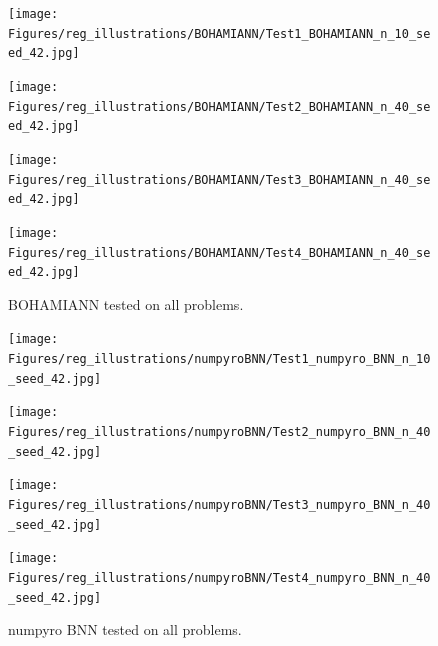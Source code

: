 \begin{figure}[h]
    \centering
    \begin{minipage}[b]{0.49\textwidth}
     \texttt{[image: Figures/reg\_illustrations/BOHAMIANN/Test1\_BOHAMIANN\_n\_10\_seed\_42.jpg]}
    \end{minipage}
    \hfill
    \begin{minipage}[b]{0.49\textwidth}
      \texttt{[image: Figures/reg\_illustrations/BOHAMIANN/Test2\_BOHAMIANN\_n\_40\_seed\_42.jpg]}
     \end{minipage}
    
     \begin{minipage}[b]{0.49\textwidth}
      \texttt{[image: Figures/reg\_illustrations/BOHAMIANN/Test3\_BOHAMIANN\_n\_40\_seed\_42.jpg]}
     \end{minipage}
     \hfill
     \begin{minipage}[b]{0.49\textwidth}
       \texttt{[image: Figures/reg\_illustrations/BOHAMIANN/Test4\_BOHAMIANN\_n\_40\_seed\_42.jpg]}
      \end{minipage}
      \caption{BOHAMIANN tested on all problems.}
\end{figure}


\begin{figure}[h]
    \centering
    \begin{minipage}[b]{0.49\textwidth}
     \texttt{[image: Figures/reg\_illustrations/numpyroBNN/Test1\_numpyro\_BNN\_n\_10\_seed\_42.jpg]}
    \end{minipage}
    \hfill
    \begin{minipage}[b]{0.49\textwidth}
      \texttt{[image: Figures/reg\_illustrations/numpyroBNN/Test2\_numpyro\_BNN\_n\_40\_seed\_42.jpg]}
     \end{minipage}
    
     \begin{minipage}[b]{0.49\textwidth}
      \texttt{[image: Figures/reg\_illustrations/numpyroBNN/Test3\_numpyro\_BNN\_n\_40\_seed\_42.jpg]}
     \end{minipage}
     \hfill
     \begin{minipage}[b]{0.49\textwidth}
       \texttt{[image: Figures/reg\_illustrations/numpyroBNN/Test4\_numpyro\_BNN\_n\_40\_seed\_42.jpg]}
      \end{minipage}
      \caption{numpyro BNN tested on all problems.}
\end{figure}